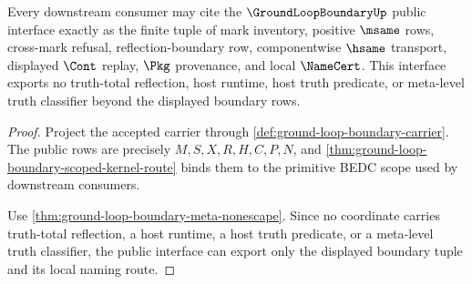 \begin{theorem}
\label{thm:ground-loop-boundary-public-interface}
Every downstream consumer may cite the $\GroundLoopBoundaryUp$ public interface exactly as the finite tuple of mark inventory, positive $\msame$ rows, cross-mark refusal, reflection-boundary row, componentwise $\hsame$ transport, displayed $\Cont$ replay, $\Pkg$ provenance, and local $\NameCert$. This interface exports no truth-total reflection, host runtime, host truth predicate, or meta-level truth classifier beyond the displayed boundary rows.
\end{theorem}
\begin{proof}
Project the accepted carrier through \autoref{def:ground-loop-boundary-carrier}. The public rows are precisely $M,S,X,R,H,C,P,N$, and \autoref{thm:ground-loop-boundary-scoped-kernel-route} binds them to the primitive BEDC scope used by downstream consumers.

Use \autoref{thm:ground-loop-boundary-meta-nonescape}. Since no coordinate carries truth-total reflection, a host runtime, a host truth predicate, or a meta-level truth classifier, the public interface can export only the displayed boundary tuple and its local naming route.
\end{proof}

